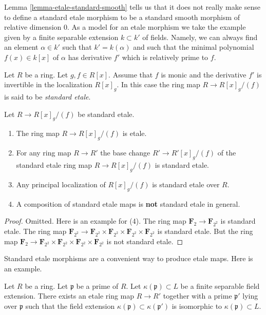 \noindent
Lemma \ref{lemma-etale-standard-smooth} tells us that it does not really
make sense to define a standard etale morphism to be
a standard smooth morphism of relative dimension $0$.
As a model for an etale morphism we take the example given
by a finite separable extension $k \subset k'$ of fields.
Namely, we can always find an element $\alpha \in k'$ such
that $k' = k(\alpha)$ and such that the minimal polynomial
$f(x) \in k[x]$ of $\alpha$ has derivative $f'$ which is
relatively prime to $f$.

\begin{definition}
\label{definition-standard-etale}
Let $R$ be a ring. Let $g , f  \in R[x]$.
Assume that $f$ is monic and the derivative $f'$ is invertible in
the localization $R[x]_g$.
In this case the ring map $R \to R[x]_g/(f)$ is said to be
{\it standard etale}.
\end{definition}

\begin{lemma}
\label{lemma-standard-etale}
Let $R \to R[x]_g/(f)$ be standard etale.
\begin{enumerate}
\item The ring map $R \to R[x]_g/(f)$ is etale.
\item For any ring map $R \to R'$ the base change $R' \to R'[x]_g/(f)$
of the standard etale ring map $R \to R[x]_g/(f)$ is standard etale.
\item Any principal localization of $R[x]_g/(f)$ is standard etale over $R$.
\item A composition of standard etale maps is {\bf not} standard etale
in general.
\end{enumerate}
\end{lemma}

\begin{proof}
Omitted. Here is an example for (4).
The ring map $\mathbf{F}_2 \to \mathbf{F}_{2^2}$ is standard etale.
The ring map
$\mathbf{F}_{2^2} \to \mathbf{F}_{2^2} \times \mathbf{F}_{2^2}
\times \mathbf{F}_{2^2} \times \mathbf{F}_{2^2}$ is standard etale.
But the ring map
$\mathbf{F}_2 \to \mathbf{F}_{2^2} \times \mathbf{F}_{2^2}
\times \mathbf{F}_{2^2} \times \mathbf{F}_{2^2}$ is not standard etale.
\end{proof}

\noindent
Standard etale morphisms are a convenient way to produce etale maps.
Here is an example.

\begin{lemma}
\label{lemma-make-etale-map-prescribed-residue-field}
Let $R$ be a ring.
Let $\mathfrak p$ be a prime of $R$.
Let $\kappa(\mathfrak p) \subset L$ be a finite separable field extension.
There exists an etale ring map $R \to R'$ together with a prime $\mathfrak p'$
lying over $\mathfrak p$ such that the field extension
$\kappa(\mathfrak p) \subset \kappa(\mathfrak p')$ is isomorphic
to $\kappa(\mathfrak p) \subset L$.
\end{lemma}

